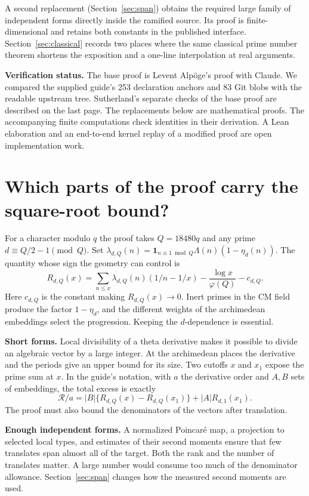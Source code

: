 \documentclass[11pt]{article}
\begin{document}
A second replacement (Section~\ref{sec:span}) obtains the required large family of independent forms directly inside the ramified source. Its proof is finite-dimensional and retains both constants in the published interface. Section~\ref{sec:classical} records two places where the same classical prime number theorem shortens the exposition and a one-line interpolation at real arguments.

\textbf{Verification status.} The base proof is Levent Alp\"oge's proof with Claude. We compared the supplied guide's 253 declaration anchors and 83 Git blobs with the readable upstream tree. Sutherland's separate checks of the base proof are described on the last page. The replacements below are mathematical proofs. The accompanying finite computations check identities in their derivation. A Lean elaboration and an end-to-end kernel replay of a modified proof are open implementation work.

\newpage
\section{Which parts of the proof carry the square-root bound?}\label{sec:map}
For a character modulo $q$ the proof takes $Q=18480q$ and any prime $d\equiv Q/2-1\pmod Q$. Set $\lambda_{d,Q}(n)=\mathbf1_{n\equiv1\bmod Q}\Lambda(n)(1-\eta_d(n))$. The quantity whose sign the geometry can control is
\[
 R_{d,Q}(x)=\sum_{n\le x}\lambda_{d,Q}(n)(1/n-1/x)
                   -\frac{\log x}{\varphi(Q)}-c_{d,Q}.
\]
Here $c_{d,Q}$ is the constant making $R_{d,Q}(x)\to0$. Inert primes in the CM field produce the factor $1-\eta_d$, and the different weights of the archimedean embeddings select the progression. Keeping the $d$-dependence is essential.

\textbf{Short forms.} Local divisibility of a theta derivative makes it possible to divide an algebraic vector by a large integer. At the archimedean places the derivative and the periods give an upper bound for its size. Two cutoffs $x$ and $x_1$ expose the prime sum at $x$. In the guide's notation, with $a$ the derivative order and $A,B$ sets of embeddings, the total excess is exactly
\[
 \mathcal R/a=|B|\{R_{d,Q}(x)-R_{d,Q}(x_1)\}+|A|R_{d,1}(x_1).
\]
The proof must also bound the denominators of the vectors after translation.

\textbf{Enough independent forms.} A normalized Poincar\'e map, a projection to selected local types, and estimates of their second moments ensure that few translates span almost all of the target. Both the rank and the number of translates matter. A large number would consume too much of the denominator allowance. Section~\ref{sec:span} changes how the measured second moments are used.
\end{document}
